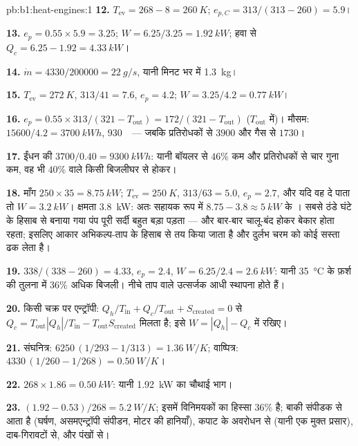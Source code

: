 \begin{solution}{pb:b1:heat-engines:1}
\textbf{12.} $T_{\mathrm{ev}} = 268 - 8 = \qty{260}{K}$; $e_{p,C} = 313/(313 - 260)
= 5.9$।

\textbf{13.} $e_p = 0.55 \times 5.9 = 3.25$; $W = 6.25/3.25 = \qty{1.92}{kW}$;
हवा से $Q_c = 6.25 - 1.92 = \qty{4.33}{kW}$।

\textbf{14.} $\dot m = 4330/200000 = \qty{22}{g/s}$, यानी मिनट भर में \qty{1.3}{kg}।

\textbf{15.} $T_{\mathrm{ev}} = \qty{272}{K}$, $313/41 = 7.6$, $e_p = 4.2$;
$W = 3.25/4.2 = \qty{0.77}{kW}$।

\textbf{16.} $e_p = 0.55 \times 313/(321 - T_{\mathrm{out}}) = 172/(321 -
T_{\mathrm{out}})$ ($T_{\mathrm{out}}$  में)। मौसम: $15600/4.2 =
\qty{3700}{kW h}$, $930$~\texteuro\ --- जबकि प्रतिरोधकों से $3900$ और
गैस से $1730$।

\textbf{17.} ईंधन की $3700/0.40 = \qty{9300}{kW h}$: यानी बॉयलर से $46\%$ कम
और प्रतिरोधकों से चार गुना कम, वह भी $40\%$ वाले किसी बिजलीघर से होकर।

\textbf{18.} माँग $250 \times 35 = \qty{8.75}{kW}$; $T_{\mathrm{ev}} = \qty{250}{K}$,
$313/63 = 5.0$, $e_p = 2.7$, और यदि वह दे पाता तो $W = \qty{3.2}{kW}$। क्षमता
\qty{3.8}{kW}: अतः सहायक रूप में $8.75 - 3.8 \approx \qty{5}{kW}$ के
। सबसे ठंडे घंटे के हिसाब से बनाया गया पंप पूरी सर्दी बहुत बड़ा
पड़ता --- और बार-बार चालू-बंद होकर बेकार होता रहता; इसलिए आकार अभिकल्प-ताप
के हिसाब से तय किया जाता है और दुर्लभ चरम को कोई सस्ता  ढक लेता है।

\textbf{19.} $338/(338 - 260) = 4.33$, $e_p = 2.4$, $W = 6.25/2.4 =
\qty{2.6}{kW}$: यानी \qty{35}{\degreeCelsius} के फ़र्श की तुलना में
$36\%$ अधिक बिजली। नीचे ताप वाले उत्सर्जक आधी स्थापना होते हैं।

\textbf{20.} किसी चक्र पर एन्ट्रॉपी: $Q_h/T_{\mathrm{in}} + Q_c/T_{\mathrm{out}} +
S_{\mathrm{created}} = 0$ से $Q_c = T_{\mathrm{out}}|Q_h|/T_{\mathrm{in}} -
T_{\mathrm{out}}S_{\mathrm{created}}$ मिलता है; इसे $W = |Q_h| - Q_c$ में रखिए।

\textbf{21.} संघनित्र: $6250\,(1/293 - 1/313) = \qty{1.36}{W/K}$; वाष्पित्र:
$4330\,(1/260 - 1/268) = \qty{0.50}{W/K}$।

\textbf{22.} $268 \times 1.86 = \qty{0.50}{kW}$: यानी \qty{1.92}{kW} का
चौथाई भाग।

\textbf{23.} $(1.92 - 0.53)/268 = \qty{5.2}{W/K}$; इसमें विनिमयकों का हिस्सा
$36\%$ है; बाकी संपीडक से आता है (घर्षण, असमएन्ट्रॉपी संपीडन, मोटर की
हानियाँ), कपाट के अवरोधन से (यानी एक मुक्त प्रसार), दाब-गिरावटों से, और
पंखों से।


\end{solution}
